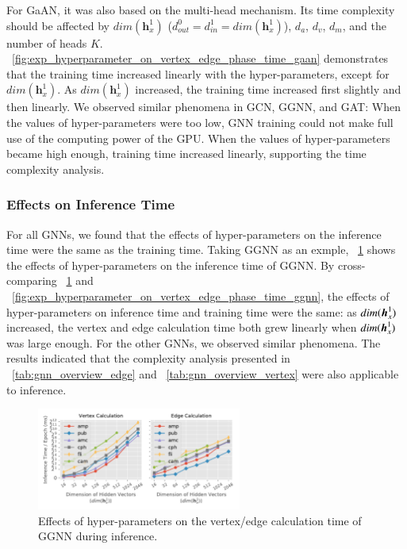 For GaAN, it was also based on the multi-head mechanism.
%
Its time complexity should be affected by $dim(\boldsymbol{h}^1_x)$ ($d^0_{out} = d^1_{in} = dim(\boldsymbol{h}^1_x)$), $d_a$, $d_v$, $d_m$, and the number of heads $K$.
%
\figurename~\ref{fig:exp_hyperparameter_on_vertex_edge_phase_time_gaan} demonstrates that the training time increased linearly with the hyper-parameters, except for $dim(\boldsymbol{h}^1_x)$.
As $dim(\boldsymbol{h}^1_x)$ increased, the training time increased first slightly and then linearly.
We observed similar phenomena in GCN, GGNN, and GAT:
When the values of hyper-parameters were too low, GNN training could not make full use of the computing power of the GPU.
%
When the values of hyper-parameters became high enough, training time increased linearly, supporting the time complexity analysis.

\subsubsection{Effects on Inference Time}

For all GNNs, we found that the effects of hyper-parameters on the inference time were the same as the training time.
%
Taking GGNN as an exmple, \figurename~\ref{fig:exp_hyperparameter_on_inference_vertex_edge_phase_time_ggnn} shows the effects of hyper-parameters on the inference time of GGNN.
%
By cross-comparing \figurename~\ref{fig:exp_hyperparameter_on_inference_vertex_edge_phase_time_ggnn} and \figurename~\ref{fig:exp_hyperparameter_on_vertex_edge_phase_time_ggnn}, the effects of hyper-parameters on inference time and training time were the same: as $dim(\boldsymbol{h}^1_x)$ increased, the vertex and edge calculation time both grew linearly when $dim(\boldsymbol{h}^1_x)$ was large enough.
%
For the other GNNs, we observed similar phenomena.
%
The results indicated that the complexity analysis presented in \tablename~\ref{tab:gnn_overview_edge} and \tablename~\ref{tab:gnn_overview_vertex} were also applicable to inference.

\begin{figure}[H]
    \centering
    \includegraphics[width=0.6\textwidth]{figs/experiments/exp_hyperparameter_on_inference_vertex_edge_phase_time_ggnn.pdf}
    \caption{Effects of hyper-parameters on the vertex/edge calculation time of GGNN during inference.}
    \label{fig:exp_hyperparameter_on_inference_vertex_edge_phase_time_ggnn}
\end{figure}


